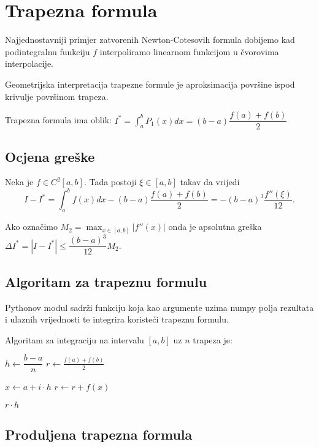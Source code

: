 \section{Trapezna formula}

Najjednostavniji primjer zatvorenih Newton-Cotesovih formula dobijemo kad
podintegralnu funkciju $f$ interpoliramo linearnom funkcijom u čvorovima
interpolacije.

Geometrijska interpretacija trapezne formule je aproksimacija površine ispod
krivulje površinom trapeza.

Trapezna formula ima oblik: $\displaystyle
I^* = \int_a^b P_1(x)dx = (b-a)\dfrac{f(a)+f(b)}{2}
$

\subsection{Ocjena greške}

Neka je $f\in C^2[a,b]$. Tada postoji $\xi \in [a,b]$ takav da vrijedi
$$
I - I^* = \int_a^b f(x) dx - (b-a)\dfrac{f(a)+f(b)}{2} = -(b-a)^3\dfrac{f''(\xi)}{12}.
$$

Ako označimo $\displaystyle M_2 = \max_{x\in[a,b]}|f''(x)|$ onda je apsolutna
greška $\displaystyle \Delta I^* = |I - I^*| \leq \dfrac{(b-a)^3}{12}M_2.$

\subsection{Algoritam za trapeznu formulu}

Pythonov  modul sadrži  funkciju koja kao
argumente uzima numpy polja rezultata i ulaznih vrijednosti te integrira
koristeći trapeznu formulu.

\bigskip
\noindent
Algoritam za integraciju na intervalu $[a, b]$ uz $n$ trapeza je:
\begin{algorithmic}
    \State $h \gets \dfrac{b - a}{n}$
    \State $r \gets \frac{f(a) + f(b)}{2}$
    
      \State $x \gets a + i \cdot h$
      \State $r \gets r + f(x)$
    \EndFor
    
    \State \Return $r \cdot h$
\EndFunction
\end{algorithmic}

\subsection{Produljena trapezna formula}

